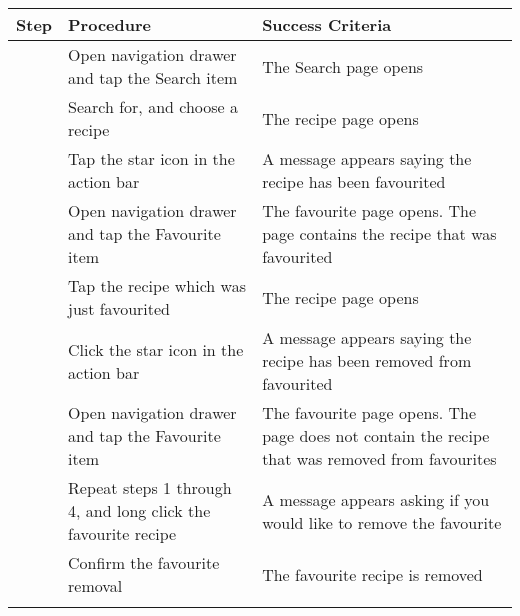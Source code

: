 \documentclass[a4paper,12pt]{report}
\newcounter{counter}
\newenvironment{testprocedure}%
{\newcommand{\step}{\arabic{counter}\stepcounter{counter}}
\setcounter{counter}{1}
\begin{center}
\begin{tabular}{| c | p{5.4cm} | p{5.4cm} |}
\hline
\textbf{Step} & \textbf{Procedure} & \textbf{Success Criteria}\\
\hline}
{\hline
\multicolumn{3}{c}{} \\%
\end{tabular}
\end{center}}
\begin{document}
\begin{testprocedure}
\step & Open navigation drawer and tap the Search item & The Search page opens\\
\hline
\step & Search for, and choose a recipe & The recipe page opens\\
\hline
\step & Tap the star icon in the action bar & A message appears saying the recipe has been favourited\\
\hline
\step & Open navigation drawer and tap the Favourite item & The favourite page opens. The page contains the recipe that was favourited\\
\hline
\step & Tap the recipe which was just favourited & The recipe page opens\\
\hline
\step & Click the star icon in the action bar & A message appears saying the recipe has been removed from favourited\\
\hline
\step & Open navigation drawer and tap the Favourite item & The favourite page opens. The page does not contain the recipe that was removed from favourites\\
\hline
\step & Repeat steps 1 through 4, and long click the favourite recipe & A message appears asking if you would like to remove the favourite\\
\hline
\step & Confirm the favourite removal & The favourite recipe is removed\\
\end{testprocedure}
\end{document}
